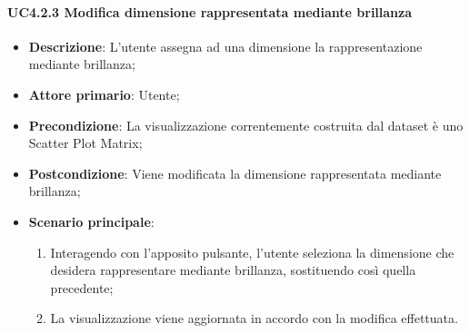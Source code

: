 \paragraph{UC4.2.3 Modifica dimensione rappresentata mediante brillanza}
\label{par:uc4.2.3}
\begin{itemize}

    \item \textbf{Descrizione}:     L'utente assegna ad una dimensione la rappresentazione mediante brillanza;
    \item \textbf{Attore primario}: Utente;
    \item \textbf{Precondizione}:   La visualizzazione correntemente costruita dal dataset è uno Scatter Plot Matrix;
    \item \textbf{Postcondizione}:  Viene modificata la dimensione rappresentata mediante brillanza;
    \item \textbf{Scenario principale}:
    \begin{enumerate}
        \item   Interagendo con l'apposito pulsante, l'utente seleziona la dimensione che desidera rappresentare 
                mediante brillanza, sostituendo così quella precedente;

        \item   La visualizzazione viene aggiornata in accordo con la modifica effettuata.
    \end{enumerate}
\end{itemize}

